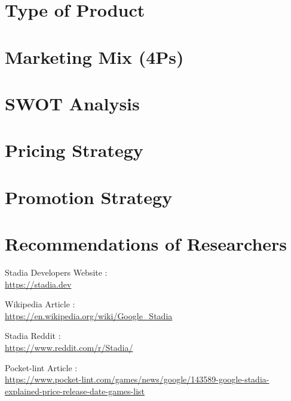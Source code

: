 \documentclass[a4paper,12pt]{article}
\newcommand{\link}[1]{{\color{blue}\href{#1}{#1}}}
\begin{document}
\section{Type of Product}

\newpage

\section{Marketing Mix (4Ps)}

\newpage

\section{SWOT Analysis}

\newpage

\section{Pricing Strategy}

\newpage

\section{Promotion Strategy}

\newpage

\section{Recommendations of Researchers}


\newpage
{}
\begin{thebibliography}{9}

Stadia Developers Website : \\ \link{https://stadia.dev}

Wikipedia Article : \\ \link{https://en.wikipedia.org/wiki/Google\_Stadia}

Stadia Reddit : \\ \link{https://www.reddit.com/r/Stadia/}

Pocket-lint Article : \\ \link{https://www.pocket-lint.com/games/news/google/143589-google-stadia-explained-price-release-date-games-list}

\end{thebibliography}
\end{document}
